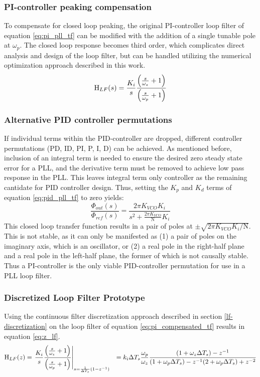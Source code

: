 		\subsubsection{PI-controller peaking compensation}
			 To compensate for closed loop peaking, the original PI-controller loop filter of equation \ref{eq:pi_pll_tf} can be modified with the addition of a single tunable pole at $\omega_p$. The closed loop response becomes third order, which complicates direct analysis and design of the loop filter, but can be handled utilizing the numerical optimization approach described in this work.
			\begin{equation} \label{eq:pi_compensated_tf}
				\textnormal{H}_{LF}(s) = \frac{K_i}{s}\frac{\left(\frac{s}{\omega_z} + 1\right)}{\left(\frac{s}{\omega_p} + 1\right)}
			\end{equation}

		\subsubsection{Alternative PID controller permutations} \label{other_pid}
			If individual terms within the PID-controller are dropped, different controller permutations (PD, ID, PI, P, I, D) can be achieved. As mentioned before, inclusion of an integral term is needed to ensure the desired zero steady state error for a PLL, and the derivative term must be removed to achieve low pass response in the PLL. This leaves integral term only controller as the remaining cantidate for PID controller design. Thus, setting the $K_p$ and $K_d$ terms of equation \ref{eq:pid_pll_tf} to zero yields:
			\begin{equation}
				\frac{\Phi_{out}(s)}{\Phi_{ref}(s)} = \frac{2\pi K_{VCO}K_i}{s^2 + \frac{2\pi K_{VCO}}{\mathrm{N}}K_i}
			\end{equation}
			This closed loop transfer function results in a pair of poles at $\pm\sqrt{2\pi K_{VCO}K_i/\mathrm{N}}$. This is not stable, as it can only be manifested as (1) a pair of poles on the imaginary axis, which is an oscillator, or (2) a real pole in the right-half plane and a real pole in the left-half plane, the former of which is not causally stable. Thus a PI-controller is the only viable PID-controller permutation for use in a PLL loop filter. 


	\subsubsection{Discretized Loop Filter Prototype}
		Using the continuous filter discretization approach described in section \ref{lf-discretization} on the loop filter of equation \ref{eq:pi_compensated_tf} results in equation \ref{eq:z_lf}.
		\begin{align}
			\textnormal{H}_{LF}(z) & = \left.\frac{K_i}{s}\frac{\left(\frac{s}{\omega_z} + 1\right)}{\left(\frac{s}{\omega_p} + 1\right)}\right\vert_{s=\frac{1}{\Delta T_s}(1-z^{-1})}
			&= k_i\Delta T_s\frac{\omega_p}{\omega_z}\frac{(1+\omega_z\Delta T_s)-z^{-1}}{(1+\omega_p\Delta T_s) - z^{-1}(2+\omega_p\Delta T_s) + z^{-2}}\label{eq:z_lf}
		\end{align}

